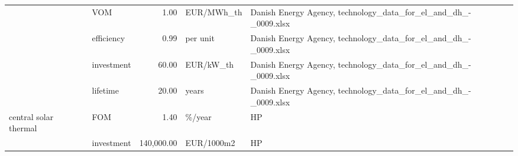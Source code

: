 \begin{longtable}{p{5cm}p{3cm}rp{3cm}p{11cm}}
                      & VOM &           1.00 &                        EUR/MWh\_th &                                                                                                                                                                                                                                                                      Danish Energy Agency, technology\_data\_for\_el\_and\_dh\_-\_0009.xlsx \\
                      & efficiency &           0.99 &                          per unit &                                                                                                                                                                                                                                                                      Danish Energy Agency, technology\_data\_for\_el\_and\_dh\_-\_0009.xlsx \\
                      & investment &          60.00 &                         EUR/kW\_th &                                                                                                                                                                                                                                                                      Danish Energy Agency, technology\_data\_for\_el\_and\_dh\_-\_0009.xlsx \\
                      & lifetime &          20.00 &                             years &                                                                                                                                                                                                                                                                      Danish Energy Agency, technology\_data\_for\_el\_and\_dh\_-\_0009.xlsx \\
central solar thermal & FOM &           1.40 &                            \%/year &                                                                                                                                                                                                                                                                                                                                   HP \\
                      & investment &     140,000.00 &                        EUR/1000m2 &                                                                                                                                                                                                                                                                                                                                   HP \\

\end{longtable}
